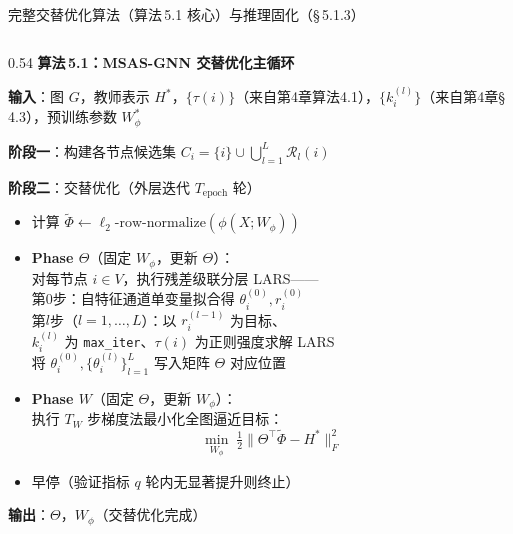 \documentclass[aspectratio=169,9pt,xcolor=dvipsnames]{beamer}
\newcommand{\blue}[1]{\textcolor{mynavy}{#1}}
\begin{document}
\begin{frame}{完整交替优化算法（算法\,5.1 核心）与推理固化（§\,5.1.3）}
\begin{columns}[T]

\begin{column}{0.54\textwidth}
  \textbf{\blue{算法\,5.1：MSAS-GNN 交替优化主循环}}

  \vspace{0.05cm}
  {
  \textbf{输入}：图 $G$，教师表示 $H^*$，$\{\tau(i)\}$（来自第4章算法4.1），$\{k_i^{(l)}\}$（来自第4章§\,4.3），预训练参数 $W_\phi^*$

  \smallskip
  \textbf{阶段一}：构建各节点候选集 $C_i=\{i\}\cup\bigcup_{l=1}^{L}\mathcal{R}_l(i)$

  \smallskip
  \textbf{阶段二}：交替优化（外层迭代 $T_{\mathrm{epoch}}$ 轮）
  \begin{itemize}\setlength{\itemsep}{1pt}
    \item 计算 $\tilde{\Phi}\leftarrow\ell_2\text{-row-normalize}(\phi(X;W_\phi))$
    \item \textbf{Phase $\Theta$}（固定 $W_\phi$，更新 $\Theta$）：\\
      对每节点 $i\in V$，执行残差级联分层 LARS——\\
      \quad 第0步：自特征通道单变量拟合得 $\theta_i^{(0)},r_i^{(0)}$\\
      \quad 第$l$步（$l=1,\ldots,L$）：以 $r_i^{(l-1)}$ 为目标、\\
      \quad\quad $k_i^{(l)}$ 为 \texttt{max\_iter}、$\tau(i)$ 为正则强度求解 LARS\\
      \quad 将 $\theta_i^{(0)},\{\theta_i^{(l)}\}_{l=1}^L$ 写入矩阵 $\Theta$ 对应位置
    \item \textbf{Phase $W$}（固定 $\Theta$，更新 $W_\phi$）：\\
      执行 $T_W$ 步梯度法最小化全图逼近目标：
      \begin{equation*}
        \min_{W_\phi}\;\tfrac{1}{2}\bigl\|\Theta^\top\tilde{\Phi}-H^*\bigr\|_F^2
      \end{equation*}
    \item 早停（验证指标 $q$ 轮内无显著提升则终止）
  \end{itemize}

  \textbf{输出}：$\Theta$，$W_\phi$（交替优化完成）
  }
\end{column}


\end{columns}
\end{frame}
\end{document}

